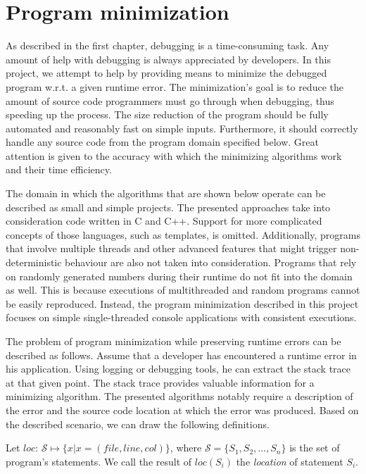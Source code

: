 \chapter{Program minimization}\label{chap:minimization}

As described in the first chapter, debugging is a time-consuming task.
Any amount of help with debugging is always appreciated by developers.
In this project, we attempt to help by providing means to minimize the 
debugged program w.r.t. a given runtime error.
The minimization's goal is to reduce the amount of source code programmers 
must go through when debugging, thus speeding up the process.
The size reduction of the program should be fully automated and reasonably 
fast on simple inputs.
Furthermore, it should correctly handle any source code from the program 
domain specified below.
Great attention is given to the accuracy with which the minimizing algorithms 
work and their time efficiency.

The domain in which the algorithms that are shown below operate can be 
described as small and simple projects.
The presented approaches take into consideration code written in C and C++.
Support for more complicated concepts of those languages, such as templates,
is omitted.
Additionally, programs that involve multiple threads and other advanced
features that might trigger non-deterministic behaviour are also not taken 
into consideration.
Programs that rely on randomly generated numbers during their runtime do not 
fit into the domain as well. 
This is because executions of multithreaded and random programs cannot be 
easily reproduced.
Instead, the program minimization described in this project focuses 
on simple single-threaded console applications with consistent executions.

The problem of program minimization while preserving runtime errors can be 
described as follows.
Assume that a developer has encountered a runtime error in his application.
Using logging or debugging tools, he can extract the stack trace at that 
given point.
The stack trace provides valuable information for a minimizing algorithm.
The presented algorithms notably require a description of the error and 
the source code location at which the error was produced.
Based on the described scenario, we can draw the following definitions.

\begin{defn}[Location]\label{def04:1}
  Let $loc$: $\mathcal{S} \mapsto \{x | x = (file, line, col)\}$, 
  where $\mathcal{S} = \{S_1, S_2, \ldots, S_n\}$ 
  is the set of program's statements.
  We call the result of $loc(S_i)$ the \emph{location} of statement $S_i$.
\end{defn}

